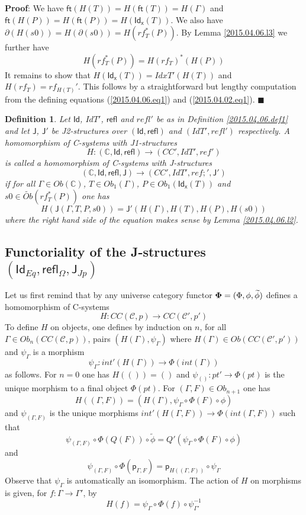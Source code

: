 \documentclass[12pt]{article}
\numberwithin{equation}{section}
\newenvironment{myproof}{{\bf Proof}:}{$\blacksquare$ \vskip 5mm }
\newtheorem{definition}[proposition]{Definition}
\newcommand{\llabel}[1]{\label{#1}}
\newcommand{\sr}{\rightarrow}
\newcommand{\wt}{\widetilde}
\newcommand{\toCC}{CC} %
\newcommand{\aCC}{{\mathbb C}}  %
\newcommand{\ft}{\mathsf{ft}}
\newcommand{\p}{\mathsf{p}}
\newcommand{\Id}{\mathsf{Id}} %
\newcommand{\refl}{\mathsf{refl}}
\newcommand{\J}{\mathsf{J}}
\newcommand{\Idx}{\mathsf{Id_x}} %
\begin{document}
%
\begin{myproof}
We have $\ft(H(T))=H(\ft(T))=H(\Gamma)$ and $\ft(H(P))=H(\ft(P))=H(\Idx(T))$. We
also have $\partial(H(s0))=H(\partial(s0))=H(rf_T^*(P))$. By Lemma
\ref{2015.04.06.l3} we further have
%
$$H(rf_T^*(P))=H(rf_T)^*(H(P))$$
%
It remains to show that $H(\Idx(T))=IdxT'(H(T))$ and $H(rf_T)=rf_{H(T)}'$. This
follows by a straightforward but lengthy computation from the defining
equations (\ref{2015.04.06.eq1}) and (\ref{2015.04.02.eq1}).
\end{myproof}
%
\begin{definition}
\llabel{2015.04.06.def2} Let $\Id$, $IdT'$, $\refl$ and $refl'$ be as in
Definition \ref{2015.04.06.def1} and let $\J$, $\J'$ be J2-structures over
$(\Id,\refl)$ and $(IdT',refl')$ respectively. A homomorphism of C-systems with
J1-structures
%
$$H:(\aCC,\Id,\refl)\sr (CC',IdT',ref')$$
%
is called a homomorphism of C-systems with J-structures
%
$$(\aCC,\Id,\refl,\J)\sr (CC',IdT',ref;',\J')$$
%
if for all $\Gamma\in Ob(\aCC)$, $T\in Ob_1(\Gamma)$, $P\in Ob_1(\Idx(T))$ and
$s0\in \wt{Ob}(rf_T^*(P))$ one has
%
$$H(\J(\Gamma,T,P,s0))=\J'(H(\Gamma),H(T),H(P),H(s0))$$
%
where the right hand side of the equation makes sense by Lemma
\ref{2015.04.06.l2}.
\end{definition}
%











\subsection{Functoriality of the J-structures $(\Id_{Eq},\refl_{\Omega},\J_{Jp})$}
%
\label{2015.04.12.sec1}
%
Let us first remind that by \cite[Construction 3.3]{Cfromauniverse} any
universe category functor ${\bf \Phi}=(\Phi,\phi,\wt{\phi})$ defines a
homomorphism of C-systems
%
$$H:\toCC({\mathcal C},p)\sr \toCC({\mathcal C}',p')$$
%
To define $H$ on objects, one defines by induction on $n$, for all $\Gamma\in
Ob_n(\toCC({\mathcal C},p))$, pairs $(H(\Gamma),\psi_{\Gamma})$ where
$H(\Gamma)\in Ob(\toCC({\mathcal C}',p'))$ and $\psi_{\Gamma}$ is a morphism
%
$$\psi_{\Gamma}:int'(H(\Gamma))\sr \Phi(int(\Gamma))$$
%
as follows. For $n=0$ one has $H(())=()$ and $\psi_{()}:pt'\sr \Phi(pt)$ is the
unique morphism to a final object $\Phi(pt)$. For $(\Gamma,F)\in Ob_{n+1}$ one
has
%
$$H((\Gamma,F))=(H(\Gamma),\psi_{\Gamma}\circ\Phi(F)\circ \phi)$$
%
and $\psi_{(\Gamma,F)}$ is the unique morphisms $int'(H(\Gamma,F))\sr
\Phi(int(\Gamma,F))$ such that
%
$$\psi_{(\Gamma,F)}\circ
\Phi(Q(F))\circ\wt{\phi}=Q'(\psi_{\Gamma}\circ\Phi(F)\circ\phi)$$
%
and
%
$$\psi_{(\Gamma,F)}\circ \Phi(\p_{\Gamma,F})=\p_{H((\Gamma,F))}\circ
\psi_{\Gamma}$$
%
Observe that $\psi_{\Gamma}$ is automatically an isomorphism. The action of $H$
on morphisms is given, for $f:\Gamma\sr\Gamma'$, by
%
$$H(f)=\psi_{\Gamma}\circ\Phi(f)\circ\psi_{\Gamma'}^{-1}$$
%
\end{document}
